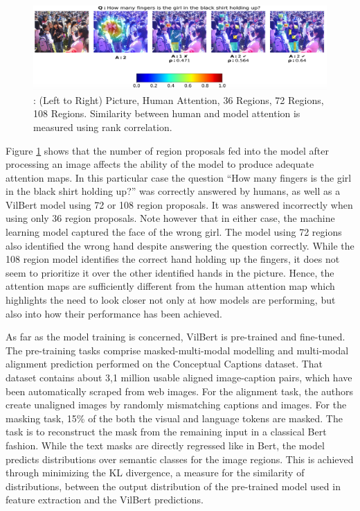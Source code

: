 \documentclass[
]{krantz}
\begin{document}
\begin{figure}

{\centering \includegraphics[width=1\linewidth]{figures/05-chapter2/vilbertmaps} 

}

\caption{\citet{sikarwar2022efficacy}: (Left to Right) Picture, Human Attention, 36 Regions, 72 Regions, 108 Regions. Similarity between human and model attention is measured using rank correlation.}\label{fig:vilbertmaps}
\end{figure}



Figure \ref{fig:vilbertmaps} shows that the number of region proposals fed into the model after processing an image affects the ability of the model to produce adequate attention maps. In this particular case the question ``How many fingers is the girl in the black shirt holding up?'' was correctly answered by humans, as well as a VilBert model using 72 or 108 region proposals. It was answered incorrectly when using only 36 region proposals. Note however that in either case, the machine learning model captured the face of the wrong girl. The model using 72 regions also identified the wrong hand despite answering the question correctly. While the 108 region model identifies the correct hand holding up the fingers, it does not seem to prioritize it over the other identified hands in the picture. Hence, the attention maps are sufficiently different from the human attention map which highlights the need to look closer not only at how models are performing, but also into how their performance has been achieved.

As far as the model training is concerned, VilBert is pre-trained and fine-tuned. The pre-training tasks comprise masked-multi-modal modelling and multi-modal alignment prediction performed on the Conceptual Captions dataset. That dataset contains about 3,1 million usable aligned image-caption pairs, which have been automatically scraped from web images. For the alignment task, the authors create unaligned images by randomly mismatching captions and images. For the masking task, 15\% of the both the visual and language tokens are masked. The task is to reconstruct the mask from the remaining input in a classical Bert fashion. While the text masks are directly regressed like in Bert, the model predicts distributions over semantic classes for the image regions. This is achieved through minimizing the KL divergence, a measure for the similarity of distributions, between the output distribution of the pre-trained model used in feature extraction and the VilBert predictions.
\end{document}
